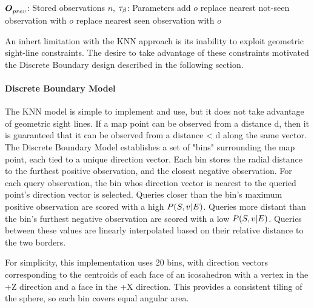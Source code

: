 \begin{singlespace}
    \begin{algorithm}[H]
        \caption[KNN Model Update]{KNN $\update{o, \feedback}$}
        \label{alg:knn_update}
        \begin{algorithmic}
            \Require $\boldsymbol{O}^{}_{prev}$: Stored observations
            \Require $n$, $\tau_{\beta}$: Parameters
            \State add $o$
            \State \Return
            \EndIf
            \If{$|\feedback| < \feedbackthreshold$}
            \State \Return
            \EndIf
            \State replace nearest not-seen observation with $o$
            \Else
            \State replace nearest seen observation with $o$
            \EndIf
            \EndFunction
        \end{algorithmic}
    \end{algorithm}
\end{singlespace}

An inhert limitation with the KNN approach is its inability to exploit geometric sight-line constraints. The desire to take advantage of these constraints motivated the Discrete Boundary design described in the following section.

\paragraph{Discrete Boundary Model}

The KNN model is simple to implement and use, but it does not take advantage of geometric sight lines. If a map point can be observed from a distance d, then it is guaranteed that it can be observed from a distance < d along the same vector. The Discrete Boundary Model establishes a set of "bins" surrounding the map point, each tied to a unique direction vector. Each bin stores the radial distance to the furthest positive observation, and the closest negative observation. For each query observation, the bin whos direction vector is nearest to the queried point's direction vector is selected. Queries closer than the bin's maximum positive observation are scored with a high $P(S,v|E)$. Queries more distant than the bin's furthest negative observation are scored with a low $P(S,v|E)$. Queries between these values are linearly interpolated based on their relative distance to the two borders.

For simplicity, this implementation uses 20 bins, with direction vectors corresponding to the centroids of each face of an icosahedron with a vertex in the +Z direction and a face in the +X direction. This provides a consistent tiling of the sphere, so each bin covers equal angular area.


